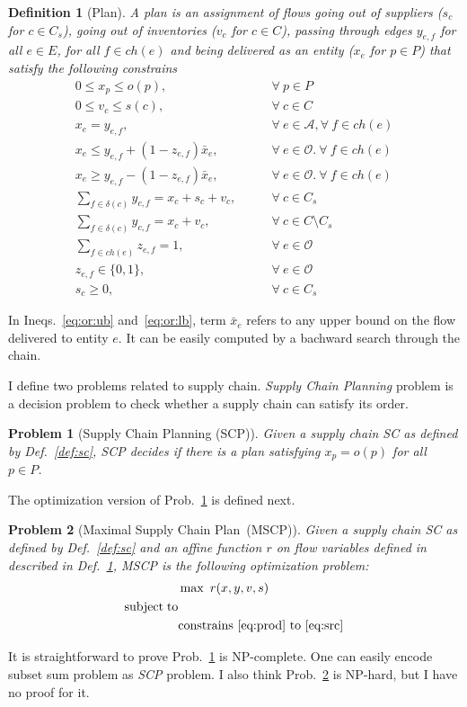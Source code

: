 \documentclass[a4paper]{article}
\newtheorem{problem}{Problem}
\newtheorem{definition}{Definition}
\newcommand{\ands}{\mathcal{A}}
\newcommand{\ors}{\mathcal{O}}
\newcommand{\SCP}{\textsl{SCP}}
\newcommand{\SC}{\textsl{SC}}
\newcommand{\chain}{\mathit{ch}}
\begin{document}
\begin{definition}[Plan]\label{def:plan}
  A \emph{plan} is an assignment of flows going out of suppliers ($s_c$ for
  $c\in C_s$), going out of inventories ($v_c$ for $c\in C$), passing through
  edges $y_{e,f}$ for all $e\in E$, for all $f\in\chain(e)$ and being delivered
  as an entity ($x_e$ for $p\in P$) that satisfy the following constrains
  \begin{align}
    0\le x_p\le o(p),&\qquad\forall~p\in P\label{eq:prod}\\
    0\le v_c\le s(c),&\qquad\forall~c\in C\\
    x_e=y_{e,f},&\qquad\forall~e\in\ands, \forall~f\in\chain(e)\\
    x_e\le
    y_{e,f}+(1-z_{e,f})\bar{x}_{e},&\qquad\forall~e\in\ors.~\forall~f\in\chain(e)\label{eq:or:ub}\\
    x_e\ge
    y_{e,f}-(1-z_{e,f})\bar{x}_{e},&\qquad\forall~e\in\ors.~\forall~f\in\chain(e)\label{eq:or:lb}\\
    \sum_{f\in\delta(c)}y_{c,f}=x_c+s_c+v_c,&\qquad\forall~c\in C_s\\
    \sum_{f\in\delta(c)}y_{c,f}=x_c+v_c,&\qquad\forall~c\in C\setminus C_s\\
    \sum_{f\in\chain(e)}z_{e,f}=1,&\qquad\forall~e\in\ors\\
    z_{e,f}\in\{0,1\},&\qquad\forall~e\in\ors\\
    s_c\ge 0,&\qquad\forall~c\in C_s\label{eq:src}
  \end{align}
\end{definition}
In Ineqs.~\eqref{eq:or:ub} and~\eqref{eq:or:lb}, term $\bar{x}_e$ refers to
any upper bound on the flow delivered to entity $e$. It can be easily computed
by a bachward search through the chain.
 
I define two problems related to supply chain. \emph{Supply Chain
  Planning} problem is a decision problem to check whether a supply
chain can satisfy its order.
\begin{problem}[Supply Chain Planning (SCP)]\label{prob:scp}
  Given a supply chain \SC{} as defined by Def.~\ref{def:sc}, \SCP{} decides
  if there is a plan satisfying $x_p=o(p)$ for all $p\in P$.
\end{problem}
The optimization version of Prob.~\ref{prob:scp} is defined next.
\begin{problem}[Maximal Supply Chain Plan~(MSCP)]\label{prob:mscp}
  Given a supply chain \SC{} as defined by Def.~\ref{def:sc} and an affine
  function $r$ on flow variables defined in described in
  Def.~\ref{def:plan}, MSCP is the following optimization problem:
  \begin{align*}
    &\max~r(x,y,v,s)\\
\mathrm{subject}\;\mathrm{to}&\\
&\mathrm{constrains}~\eqref{eq:prod}~\mathrm{to}~\eqref{eq:src}
  \end{align*}
\end{problem}
It is straightforward to prove Prob.~\ref{prob:scp} is NP-complete. One can
easily encode subset sum problem as \SCP{} problem. I also think
Prob.~\ref{prob:mscp} is NP-hard, but I have no proof for it.
\end{document}
